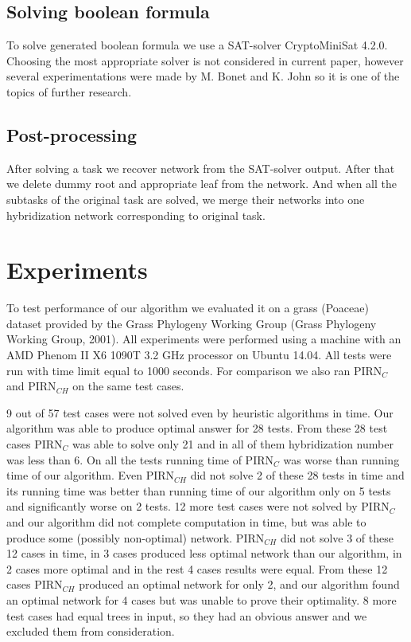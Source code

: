 \documentclass[runningheads, envcountsame, a4paper]{llncs}
\begin{document}
\subsection{Solving boolean formula}

To solve generated boolean formula we use a SAT-solver CryptoMiniSat 4.2.0. Choosing the most appropriate solver 
is not considered in current paper, however several experimentations were made by M. Bonet and K. John \cite {bonet2009efficiently} 
so it is one of the topics of further research.

\subsection{Post-processing}

After solving a task we recover network from the SAT-solver output. After that we delete dummy root and appropriate 
leaf from the network. And when all the subtasks of the original task are solved, we merge their networks into one 
hybridization network corresponding to original task.

\section{Experiments}

To test performance of our algorithm we evaluated it on a grass (Poaceae) dataset provided by the Grass Phylogeny Working Group 
(Grass Phylogeny Working Group, 2001). All experiments were performed using a machine with an AMD Phenom II X6 1090T 3.2 GHz 
processor on Ubuntu 14.04. All tests were run with time limit equal to 1000 seconds. For comparison we also ran PIRN$_C$ and PIRN$_{CH}$ 
on the same test cases. 

9 out of 57 test cases were not solved even by heuristic algorithms in time. Our algorithm was able to produce optimal answer for 28
tests. From these 28 test cases PIRN$_C$ was able to solve only 21 and in all of them hybridization number was less than 6. 
On all the tests running time of PIRN$_C$ was worse than running time of our algorithm.
Even PIRN$_{CH}$ did not solve 2 of these 28 tests in time and its running time was better than running time of our algorithm only
on 5 tests and significantly worse on 2 tests. 12 more test cases were not solved by PIRN$_C$ and our algorithm did not complete computation 
in time, but was able to produce some (possibly non-optimal) network. PIRN$_{CH}$ did not solve 3 of these 12 cases in time, in 3 cases 
produced less optimal network than our algorithm, in 2 cases more optimal and in the rest 4 cases results were equal. From these 12 cases PIRN$_{CH}$
produced an optimal network for only 2, and our algorithm found an optimal network for 4 cases but was unable to prove their optimality. 
8 more test cases had equal trees in input, so they had an obvious answer and we excluded them from consideration.
\end{document}
